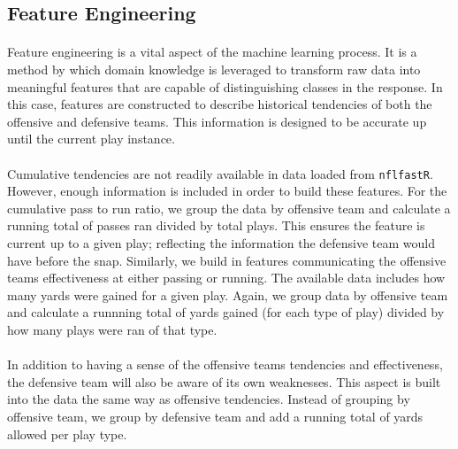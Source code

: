 \documentclass[11pt]{article}
\begin{document}
\begin{multicols*}{2}
        \subsection{Feature Engineering}
            \paragraph{} 
                Feature engineering is a vital aspect of the machine learning process. 
                It is a method by which domain knowledge is leveraged to transform raw data into meaningful features that are capable of distinguishing classes in the response.
                In this case, features are constructed to describe historical tendencies of both the offensive and defensive teams.
                This information is designed to be accurate up until the current play instance. 
            
        \vspace{-10pt} 
            
            \paragraph{}
                Cumulative tendencies are not readily available in data loaded from \texttt{nflfastR}. 
                However, enough information is included in order to build these features. 
                For the cumulative pass to run ratio, we group the data by offensive team and calculate a running total of passes ran divided by total plays. 
                This ensures the feature is current up to a given play; reflecting the information the defensive team would have before the snap. 
                Similarly, we build in features communicating the offensive teams effectiveness at either passing or running.
                The available data includes how many yards were gained for a given play. 
                Again, we group data by offensive team and calculate a runnning total of yards gained (for each type of play) divided by how many plays were ran of that type.  
                 
        \vspace{-10pt}

            \paragraph{}
                In addition to having a sense of the offensive teams tendencies and effectiveness, the defensive team will also be aware of its own weaknesses.
                This aspect is built into the data the same way as offensive tendencies. 
                Instead of grouping by offensive team, we group by defensive team and add a running total of yards allowed per play type.
        

\end{multicols*}
\end{document}
